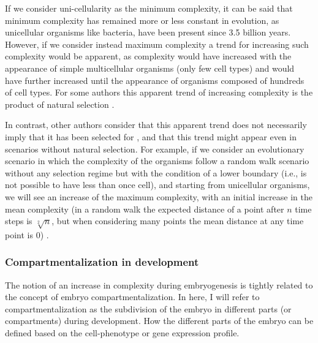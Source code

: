 If we consider uni-cellularity as the minimum complexity, it can be said that minimum complexity has remained more or less constant in evolution, as unicellular organisms like bacteria, have been present since 3.5 billion years. However, if we consider instead maximum complexity a trend for increasing such complexity would be apparent, as complexity would have increased with the appearance of simple multicellular organisms (only few cell types) and would have further increased until the appearance of organisms composed of hundreds of cell types. For some authors this apparent trend of increasing complexity is the product of natural selection \citep{bonner1988evolution,Carroll2001}.

In contrast, other authors consider that this apparent trend does not necessarily imply that it has been selected for \citep{McShea2015}, and that this trend might appear even in scenarios without natural selection. 
For example, if we consider an evolutionary scenario in which the complexity of the organisms follow a random walk scenario without any selection regime but with the condition of a lower boundary (i.e., is not possible to have less than once cell), and starting from unicellular organisms, we will see an increase of the maximum complexity, with an initial increase in the mean complexity (in a random walk the expected distance of a point after $n$ time steps is $\sqrt[2]{n}$, but when considering many points the mean distance at any time point is 0) \citep{gould1996fullhouse}.

\subsubsection{Compartmentalization in development}

The notion of an increase in complexity during embryogenesis is tightly related to the concept of embryo compartmentalization.
%
In here, I will refer to compartmentalization as the subdivision of the embryo in different parts (or compartments) during development. 
How the different parts of the embryo can be defined based on the cell-phenotype or gene expression profile.


